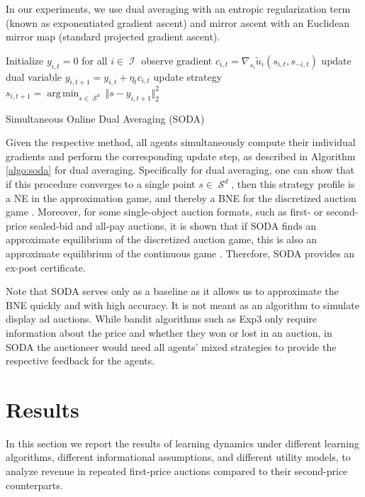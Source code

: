 \documentclass{article}
\DeclareMathOperator*{\argmin}{arg\,min}
\DeclareMathOperator{\Ical}{\mathcal{I}}
\DeclareMathOperator{\Scal}{\mathcal{S}}
\begin{document}
In our experiments, we use dual averaging \citep{nesterov2009PrimaldualSubgradientMethods} with an entropic regularization term (known as exponentiated gradient ascent) and mirror ascent \citep{nemirovskij1983problem} with an Euclidean mirror map (standard projected gradient ascent).
\begin{algorithm}[h]
	\SetAlgoNoLine
	Initialize $y_{i,t} = 0$ for all $i \in \Ical$
	{
		{
			observe gradient $c_{i,t} = \nabla_{s_i} \tilde u_i(s_{i,t},s_{-i,t})$\;
			update dual variable $y_{i,t+1} = y_{i,t} + \eta_t c_{i,t}  $\;
			update strategy $s_{i,t+1} = \argmin_{s \in \Scal^d} \Vert s - y_{i,t+1} \Vert_2^2 $\;
		}
	}
	\caption{Simultaneous Online Dual Averaging (SODA)}
	\label{algo:soda}
\end{algorithm}
Given the respective method, all agents simultaneously compute their individual gradients and perform the corresponding update step, as described in Algorithm \ref{algo:soda} for dual averaging. 
Specifically for dual averaging, one can show that if this procedure converges to a single point $s \in \Scal^d$, then this strategy profile is a NE in the approximation game, and thereby a BNE for the discretized auction game \citep[Corollary~1]{bichler2023soda}. Moreover, for some single-object auction formats, such as first- or second-price sealed-bid and all-pay auctions, it is shown that if SODA finds an approximate equilibrium of the discretized auction game, this is also an approximate equilibrium of the continuous game \citep[Theorem~1]{bichler2023soda}. Therefore, SODA provides an ex-post certificate. 

Note that SODA serves only as a baseline as it allows us to approximate the BNE quickly and with high accuracy. It is not meant as an algorithm to simulate display ad auctions. While bandit algorithms such as Exp3 only require information about the price and whether they won or lost in an auction, in SODA the auctioneer would need all agents' mixed strategies to provide the respective feedback for the agents. 

\section{Results}
In this section we report the results of learning dynamics under different learning algorithms, different informational assumptions, and different utility models, to analyze revenue in repeated first-price auctions compared to their second-price counterparts.
\end{document}
